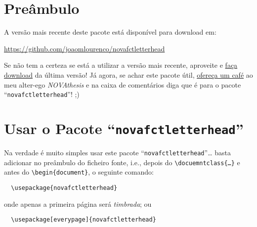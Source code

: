 \documentclass[a4paper,11pt]{article}
\title{\theTitle}
\author{\theAuthor}
\newcommand*{\thePackage}{“\texttt{novafctletterhead}”}
\begin{document}
\maketitle

\thispagestyle{empty}%

\begin{abstract}
    Este documento é simultaneamente um manual de instruções e um exemplo de como usar o pacote “\thePackage”.  Este pacote permite produzir documentos em \emph{papel letterhead} da FCT-NOVA.
\end{abstract}


\section{Preâmbulo}

A versão mais recente deste pacote está disponível para download em:

\begin{center}
  \url{https://github.com/joaomlourenco/novafctletterhead}
\end{center}

Se não tem a certeza se está a utilizar a versão mais recente, aproveite e \href{https://github.com/joaomlourenco/novafctletterhead/archive/refs/heads/main.zip}{faça download} da última versão!   Já agora, se achar este pacote útil, \href{https://www.paypal.com/donate/?hosted_button_id=8WA8FRVMB78W8}{ofereça um café} ao meu alter-ego \emph{NOVAthesis} e na caixa de comentários diga que é para o pacote \thePackage! ;)


\section{Usar o Pacote \thePackage}

Na verdade é muito simples usar este pacote \thePackage…  basta adicionar no preâmbulo do ficheiro fonte, i.e., depois do \verb!\docuemntclass{…}! e antes do \verb!\begin{document}!, o seguinte comando:

\begin{verbatim}
  \usepackage{novafctletterhead}
\end{verbatim}

\noindent onde apenas a primeira página será \emph{timbrada}; ou

\begin{verbatim}
  \usepackage[everypage]{novafctletterhead}
\end{verbatim}
\end{document}
